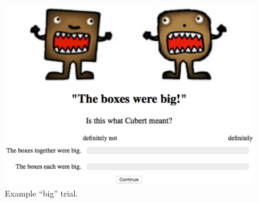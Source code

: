 \documentclass[linguex]{sp}
\newcommand{\ndg}[1]{\textcolor{Green}{[ndg: #1]}}
\begin{document}
\begin{figure}[h]
\centering
\includegraphics[width=4.5in]{images/trial.eps}
\caption{Example ``big'' trial.}\label{trial}
\end{figure}

%
%
%
\end{document}
